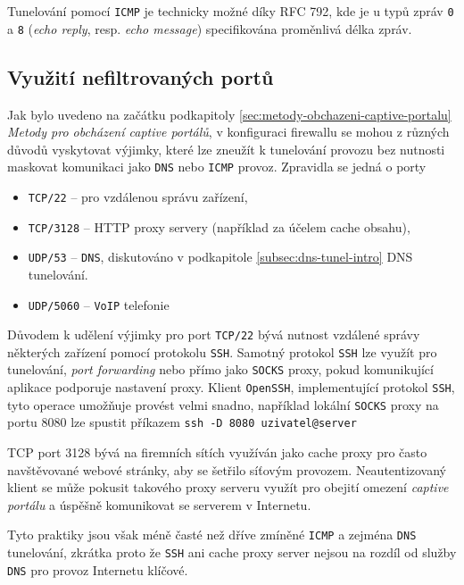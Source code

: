 \documentclass[thesis=M,czech]{FITthesis}[2012/10/20]
\begin{document}
Tunelování pomocí \texttt{ICMP} je technicky možné díky RFC 792\cite{rfc792}, kde je u typů zpráv \texttt{0} a \texttt{8} (\textit{echo reply}, resp. \textit{echo message}) specifikována proměnlivá délka zpráv.

\subsection{Využití nefiltrovaných portů}
\label{subsec:nonfiltered-ports}
Jak bylo uvedeno na začátku podkapitoly \ref{sec:metody-obchazeni-captive-portalu} \textit{Metody pro obcházení captive portálů}, v konfiguraci firewallu se mohou z různých důvodů vyskytovat výjimky, které lze zneužít k tunelování provozu bez nutnosti maskovat komunikaci jako \texttt{DNS} nebo \texttt{ICMP} provoz. Zpravidla\cite{defcon-captive-article} se jedná o porty 

\begin{itemize}
 \item \texttt{TCP/22} -- pro vzdálenou správu zařízení,
 \item \texttt{TCP/3128} -- HTTP proxy servery (například za účelem cache obsahu),
 \item \texttt{UDP/53} -- \texttt{DNS}, diskutováno v podkapitole \ref{subsec:dns-tunel-intro} DNS tunelování.
 \item \texttt{UDP/5060} -- \texttt{VoIP} telefonie
\end{itemize}

Důvodem k udělení výjimky pro port \texttt{TCP/22} bývá nutnost vzdálené správy některých zařízení pomocí protokolu \texttt{SSH}. Samotný protokol \texttt{SSH} lze využít pro tunelování, \textit{port forwarding} nebo přímo jako \texttt{SOCKS} proxy, pokud komunikující aplikace podporuje nastavení proxy. Klient \texttt{OpenSSH}, implementující protokol \texttt{SSH}, tyto operace umožňuje provést velmi snadno, například lokální \texttt{SOCKS} proxy na portu 8080 lze spustit příkazem \texttt{ssh -D 8080 uzivatel@server}

TCP port 3128 bývá na firemních sítích využíván jako cache proxy pro často navštěvované webové stránky, aby se šetřilo síťovým provozem. Neautentizovaný klient se může pokusit takového proxy serveru využít pro obejití omezení \textit{captive portálu} a úspěšně komunikovat se serverem v Internetu.

Tyto praktiky jsou však méně časté než dříve zmíněné \texttt{ICMP} a zejména \texttt{DNS} tunelování, zkrátka proto že \texttt{SSH} ani cache proxy server nejsou na rozdíl od služby \texttt{DNS} pro provoz Internetu klíčové.
\end{document}
